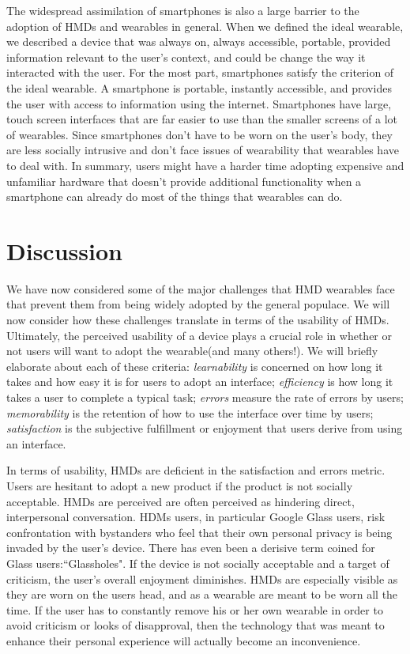 \documentclass[11pt]{article}
\begin{document}
The widespread assimilation of smartphones is also a large barrier to the adoption of HMDs and wearables in general. When we defined the ideal wearable, we described a device that was always on, always accessible, portable, provided information relevant to the user's context, and could be change the way it interacted with the user. For the most part, smartphones satisfy the criterion of the ideal wearable\cite{fromCyborgsToGG}. A smartphone is portable, instantly accessible, and provides the user with access to information using the internet. Smartphones have large, touch screen interfaces that are far easier to use than the smaller screens of a lot of wearables. Since smartphones don't have to be worn on the user's body, they are less socially intrusive and don't face issues of wearability that wearables have to deal with. In summary, users might have a harder time adopting expensive and unfamiliar hardware that doesn't provide additional functionality when a smartphone can already do most of the things that wearables can do.  

\section{Discussion}

We have now considered some of the major challenges that HMD wearables face that prevent them from being widely adopted by the general populace. We will now consider how these challenges translate in terms of the usability of HMDs.  Ultimately, the perceived usability of a device plays a crucial role in whether or not users will want to adopt the wearable\cite{WearableHumanView}\cite{UserAcceptance}\cite{WhyUsersDont}\cite{hmdOlderAdults}(and many others!). We will briefly elaborate about each of these criteria: \textit{learnability} is concerned on how long it takes and how easy it is for users to adopt an interface; \textit{efficiency} is how long it takes a user to complete a typical task; \textit{errors} measure the rate of errors by users; \textit{memorability} is the retention of how to use the interface over time by users; \textit{satisfaction} is the subjective fulfillment or enjoyment that users derive from using an interface. 

In terms of usability, HMDs are deficient in the satisfaction and errors metric. Users are hesitant to adopt a new product if the product is not socially acceptable. HMDs are perceived are often perceived as hindering direct, interpersonal conversation. HDMs users, in particular Google Glass users, risk confrontation with bystanders who feel that their own personal privacy is being invaded by the user's device. There has even been a derisive term coined for Glass users:``Glassholes"\cite{negativeGlassReactions}. If the device is not socially acceptable and a target of criticism, the user's overall enjoyment diminishes. HMDs are especially visible as they are worn on the users head, and as a wearable are meant to be worn all the time. If the user has to constantly remove his or her own wearable in order to avoid criticism or looks of disapproval, then the technology that was meant to enhance their personal experience will actually become an inconvenience. 
\end{document}
